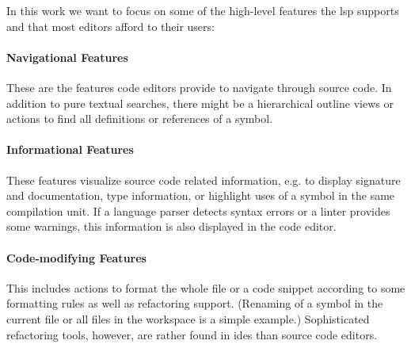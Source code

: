 \documentclass[sigplan,10pt,review,anonymous]{acmart}
\begin{document}

In this work we want to focus on some of the high-level features the \ac{lsp}
supports and that most editors afford to their users:

\paragraph{Navigational Features}
These are the features code editors provide to navigate through source code. In
addition to pure textual searches, there might be a hierarchical outline views
or actions to find all definitions or references of a symbol.

\paragraph{Informational Features}
These features visualize source code related information, e.g. to display
signature and documentation, type information, or highlight uses of a symbol in
the same compilation unit. If a language parser detects syntax errors or a
linter provides some warnings, this information is also displayed in the code
editor.

\paragraph{Code-modifying Features}
This includes actions to format the whole file or a code snippet according to
some formatting rules as well as refactoring support. (Renaming of a symbol in
the current file or all files in the workspace is a simple example.)
Sophisticated refactoring tools, however, are rather found in \acp{ide} than
source code editors.
\end{document}
